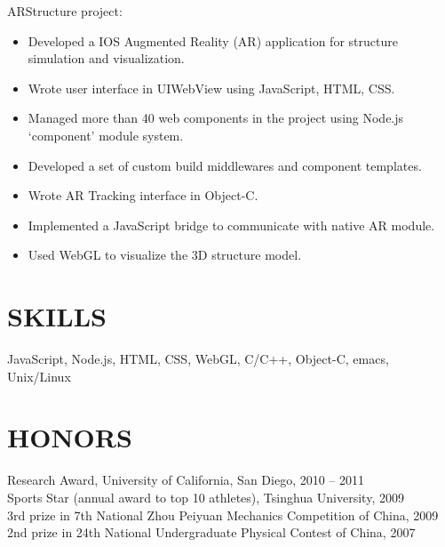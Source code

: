 \documentclass[margin,11pt]{res}
\begin{document}
\begin{resume}
  ARStructure project:
  \begin{itemize}
  \item[] Developed a IOS Augmented Reality (AR) application for structure simulation and visualization.
  \item[] Wrote user interface in UIWebView using JavaScript, HTML, CSS.
  \item[] Managed more than 40 web components in the project using Node.js `component' module system.
  \item[] Developed a set of custom build middlewares and component templates.
  \item[] Wrote AR Tracking interface in Object-C.
  \item[] Implemented a JavaScript bridge to communicate with native AR module.
  \item[] Used WebGL to visualize the 3D structure model.
  \end{itemize}

  \section{SKILLS}
  JavaScript, Node.js, HTML, CSS, WebGL, C/C++, Object-C, emacs, Unix/Linux

  \section{HONORS}
  Research Award, University of California, San Diego, 2010 -- 2011 \\
  Sports Star (annual award to top 10 athletes), Tsinghua University, 2009 \\
  3rd prize in 7th National Zhou Peiyuan Mechanics Competition of China, 2009 \\
  2nd prize in 24th National Undergraduate Physical Contest of China, 2007

\end{resume}
\end{document}
